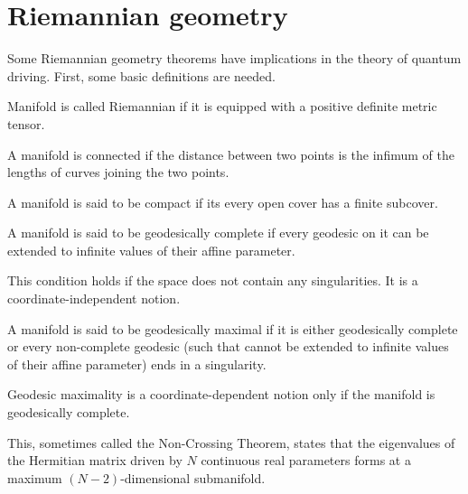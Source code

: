 
\section{Riemannian geometry}
Some Riemannian geometry theorems have implications in the theory of quantum driving. First, some basic definitions are needed.

\begin{definition}
    Manifold is called Riemannian if it is equipped with a positive definite metric tensor.
\end{definition}
\begin{definition}
    A manifold is connected if the distance between two points is the infimum of the lengths of curves joining the two points.
\end{definition}
\begin{definition}
    A manifold is said to be compact if its every open cover has a finite subcover.
\end{definition}
\begin{definition}
    A manifold is said to be geodesically complete if every geodesic on it can be extended to infinite values of their affine parameter. 
\end{definition}
This condition holds if the space does not contain any singularities. It is a coordinate-independent notion.
\begin{definition}
    A manifold is said to be geodesically maximal if it is either geodesically complete or every non-complete geodesic (such that cannot be extended to infinite values of their affine parameter) ends in a singularity.
\end{definition}
Geodesic maximality is a coordinate-dependent notion only if the manifold is geodesically complete.


\begin{thm}\emph{\citet[page 305]{landau}}
    \label{thm:n-2}

    This, sometimes called the Non-Crossing Theorem, states that the eigenvalues of the Hermitian matrix driven by $N$ continuous real parameters forms at a maximum $(N-2)$-dimensional submanifold.
\end{thm}


